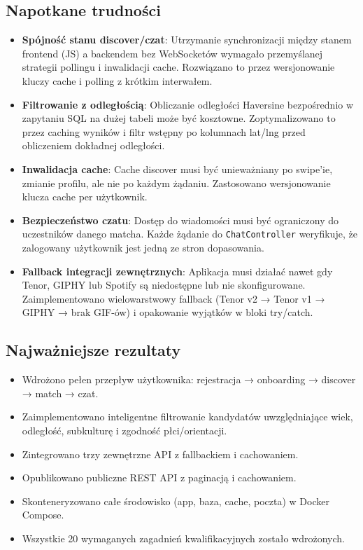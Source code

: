 \documentclass[12pt,a4paper]{article}
\begin{document}
\subsection{Napotkane trudności}

\begin{itemize}
    \item \textbf{Spójność stanu discover/czat}: Utrzymanie synchronizacji między stanem frontend (JS) a backendem bez WebSocketów wymagało przemyślanej strategii pollingu i inwalidacji cache. Rozwiązano to przez wersjonowanie kluczy cache i polling z krótkim interwałem.

    \item \textbf{Filtrowanie z odległością}: Obliczanie odległości Haversine bezpośrednio w zapytaniu SQL na dużej tabeli może być kosztowne. Zoptymalizowano to przez caching wyników i filtr wstępny po kolumnach lat/lng przed obliczeniem dokładnej odległości.

    \item \textbf{Inwalidacja cache}: Cache discover musi być unieważniany po swipe'ie, zmianie profilu, ale nie po każdym żądaniu. Zastosowano wersjonowanie klucza cache per użytkownik.

    \item \textbf{Bezpieczeństwo czatu}: Dostęp do wiadomości musi być ograniczony do uczestników danego matcha. Każde żądanie do \texttt{ChatController} weryfikuje, że zalogowany użytkownik jest jedną ze stron dopasowania.

    \item \textbf{Fallback integracji zewnętrznych}: Aplikacja musi działać nawet gdy Tenor, GIPHY lub Spotify są niedostępne lub nie skonfigurowane. Zaimplementowano wielowarstwowy fallback (Tenor v2 → Tenor v1 → GIPHY → brak GIF-ów) i opakowanie wyjątków w bloki try/catch.
\end{itemize}

\subsection{Najważniejsze rezultaty}

\begin{itemize}
    \item Wdrożono pełen przepływ użytkownika: rejestracja → onboarding → discover → match → czat.
    \item Zaimplementowano inteligentne filtrowanie kandydatów uwzględniające wiek, odległość, subkulturę i zgodność płci/orientacji.
    \item Zintegrowano trzy zewnętrzne API z fallbackiem i cachowaniem.
    \item Opublikowano publiczne REST API z paginacją i cachowaniem.
    \item Skonteneryzowano całe środowisko (app, baza, cache, poczta) w Docker Compose.
    \item Wszystkie 20 wymaganych zagadnień kwalifikacyjnych zostało wdrożonych.
\end{itemize}
\end{document}
